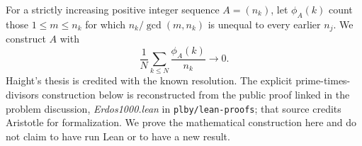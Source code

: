 For a strictly increasing positive integer sequence $A=(n_k)$, let $\phi_A(k)$ count those $1\le m\le n_k$ for which
$n_k/\gcd(m,n_k)$ is unequal to every earlier $n_j$.
We construct $A$ with
\[
 \frac1N\sum_{k\le N}\frac{\phi_A(k)}{n_k}\longrightarrow0.
\]
Haight's thesis is credited with the known resolution. The explicit prime-times-divisors construction below is reconstructed from the public proof linked in the problem discussion, \emph{Erdos1000.lean} in \texttt{plby/lean-proofs}; that source credits Aristotle for formalization. We prove the mathematical construction here and do not claim to have run Lean or to have a new result.
